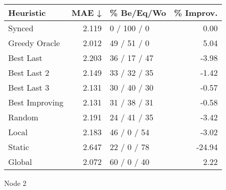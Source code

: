 \begin{tabular}{lrlr}
\toprule
\textbf{Heuristic} & \textbf{MAE ↓} & \textbf{\% Be/Eq/Wo} & \textbf{\% Improv.} \\
\midrule
            Synced &          2.119 &          0 / 100 / 0 &                0.00 \\
     Greedy Oracle &          2.012 &          49 / 51 / 0 &                5.04 \\
         Best Last &          2.203 &         36 / 17 / 47 &               -3.98 \\
       Best Last 2 &          2.149 &         33 / 32 / 35 &               -1.42 \\
       Best Last 3 &          2.131 &         30 / 40 / 30 &               -0.57 \\
    Best Improving &          2.131 &         31 / 38 / 31 &               -0.58 \\
            Random &          2.191 &         24 / 41 / 35 &               -3.42 \\
             Local &          2.183 &          46 / 0 / 54 &               -3.02 \\
            Static &          2.647 &          22 / 0 / 78 &              -24.94 \\
            Global &          2.072 &          60 / 0 / 40 &                2.22 \\
\bottomrule
\end{tabular}
\caption{Node 2}
\label{tab:hr_non_lr05_le2_bs2_2}
